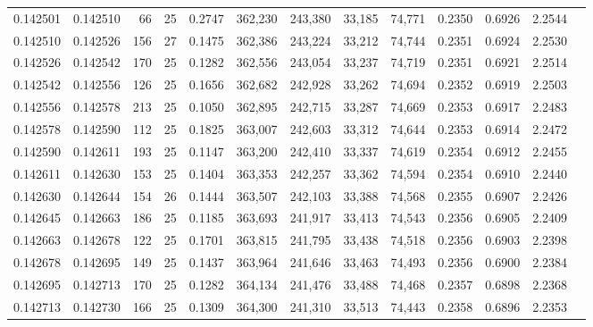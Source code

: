 \begin{tabular}{rrrrrrrrrrrrr}
0.142501 & 0.142510 &    66 &  25 &                                     0.2747 & 362,230 & 243,380 &  33,185 &  74,771 & 0.2350 & 0.6926 & 2.2544 \\
0.142510 & 0.142526 &   156 &  27 &                                     0.1475 & 362,386 & 243,224 &  33,212 &  74,744 & 0.2351 & 0.6924 & 2.2530 \\
0.142526 & 0.142542 &   170 &  25 &                                     0.1282 & 362,556 & 243,054 &  33,237 &  74,719 & 0.2351 & 0.6921 & 2.2514 \\
0.142542 & 0.142556 &   126 &  25 &                                     0.1656 & 362,682 & 242,928 &  33,262 &  74,694 & 0.2352 & 0.6919 & 2.2503 \\
0.142556 & 0.142578 &   213 &  25 &                                     0.1050 & 362,895 & 242,715 &  33,287 &  74,669 & 0.2353 & 0.6917 & 2.2483 \\
0.142578 & 0.142590 &   112 &  25 &                                     0.1825 & 363,007 & 242,603 &  33,312 &  74,644 & 0.2353 & 0.6914 & 2.2472 \\
0.142590 & 0.142611 &   193 &  25 &                                     0.1147 & 363,200 & 242,410 &  33,337 &  74,619 & 0.2354 & 0.6912 & 2.2455 \\
0.142611 & 0.142630 &   153 &  25 &                                     0.1404 & 363,353 & 242,257 &  33,362 &  74,594 & 0.2354 & 0.6910 & 2.2440 \\
0.142630 & 0.142644 &   154 &  26 &                                     0.1444 & 363,507 & 242,103 &  33,388 &  74,568 & 0.2355 & 0.6907 & 2.2426 \\
0.142645 & 0.142663 &   186 &  25 &                                     0.1185 & 363,693 & 241,917 &  33,413 &  74,543 & 0.2356 & 0.6905 & 2.2409 \\
0.142663 & 0.142678 &   122 &  25 &                                     0.1701 & 363,815 & 241,795 &  33,438 &  74,518 & 0.2356 & 0.6903 & 2.2398 \\
0.142678 & 0.142695 &   149 &  25 &                                     0.1437 & 363,964 & 241,646 &  33,463 &  74,493 & 0.2356 & 0.6900 & 2.2384 \\
0.142695 & 0.142713 &   170 &  25 &                                     0.1282 & 364,134 & 241,476 &  33,488 &  74,468 & 0.2357 & 0.6898 & 2.2368 \\
0.142713 & 0.142730 &   166 &  25 &                                     0.1309 & 364,300 & 241,310 &  33,513 &  74,443 & 0.2358 & 0.6896 & 2.2353 \\

\end{tabular}
